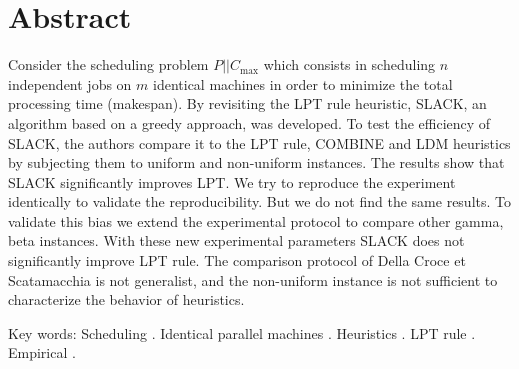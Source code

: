 \documentclass[a4paper,12pt]{report}
\theoremstyle{plain}				%
\theoremstyle{definition}				%
\newcommand\problemGrahamP{$P||C_{\max}$\xspace}
\newcommand\dcs{Della Croce et Scatamacchia\xspace}
\begin{document}


\clearpage



\section*{Abstract} \label{sec:abstract}
Consider the scheduling problem \problemGrahamP which consists in scheduling $n$ independent jobs 
  on $m$ identical machines in order to minimize the total processing time (makespan).
By revisiting the LPT rule heuristic, SLACK, an algorithm based on a greedy approach, was developed. 
To test the efficiency of SLACK, the authors compare it to the LPT rule, COMBINE and LDM heuristics by 
  subjecting them to uniform and non-uniform instances. 
The results show that SLACK significantly improves LPT.
We try to reproduce the experiment identically to validate the reproducibility. 
But we do not find the same results. 
To validate this bias we extend the experimental protocol to compare  
  other gamma, beta instances. 
With these new experimental parameters SLACK does not significantly improve LPT rule.
The comparison protocol of \dcs is not generalist, and the non-uniform instance is not sufficient to characterize the behavior of heuristics. 

Key words: Scheduling . Identical parallel machines . Heuristics . LPT rule . Empirical .     




\bigskip
{}
\end{document}
